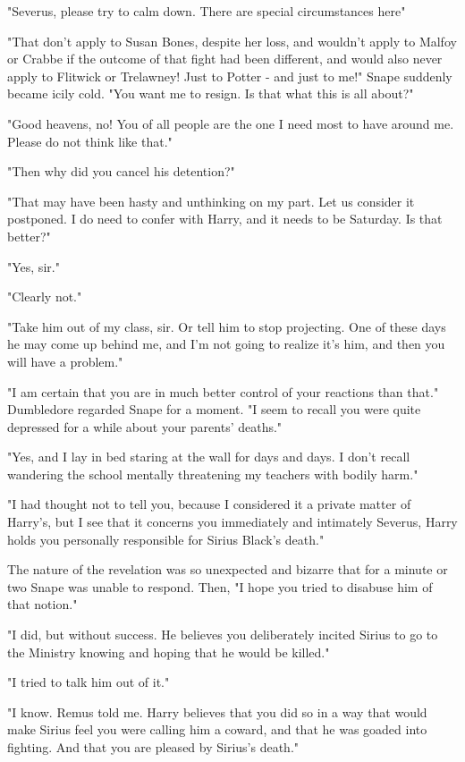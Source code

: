 "Severus, please try to calm down. There are special circumstances here{\el}"

"That don't apply to Susan Bones, despite her loss, and wouldn't apply to Malfoy or Crabbe if the outcome of that fight had been different, and would also never apply to Flitwick or Trelawney! Just to Potter - and just to me!" Snape suddenly became icily cold. "You want me to resign. Is that what this is all about?"

"Good heavens, no! You of all people are the one I need most to have around me. Please do not think like that."

"Then why did you cancel his detention?"

"That may have been hasty and unthinking on my part. Let us consider it postponed. I do need to confer with Harry, and it needs to be Saturday. Is that better?"

"Yes, sir."

"Clearly not."

"Take him out of my class, sir. Or tell him to stop projecting. One of these days he may come up behind me, and I'm not going to realize it's him, and then you will have a problem."

"I am certain that you are in much better control of your reactions than that." Dumbledore regarded Snape for a moment. "I seem to recall you were quite depressed for a while about your parents' deaths."

"Yes, and I lay in bed staring at the wall for days and days. I don't recall wandering the school mentally threatening my teachers with bodily harm."

"I had thought not to tell you, because I considered it a private matter of Harry's, but I see that it concerns you immediately and intimately{\el} Severus, Harry holds you personally responsible for Sirius Black's death."

The nature of the revelation was so unexpected and bizarre that for a minute or two Snape was unable to respond. Then, "I hope you tried to disabuse him of that notion."

"I did, but without success. He believes you deliberately incited Sirius to go to the Ministry knowing and hoping that he would be killed."

"I tried to talk him out of it."

"I know. Remus told me. Harry believes that you did so in a way that would make Sirius feel you were calling him a coward, and that he was goaded into fighting. And that you are pleased by Sirius's death."

